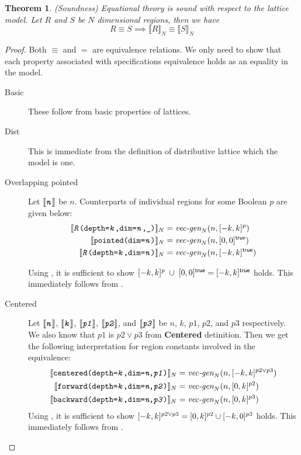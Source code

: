 \documentclass{article}
\theoremstyle{definition}
\theoremstyle{plain}
\newtheorem{thm}{Theorem}
\newcommand{\interp}[1]{\llbracket {#1} \rrbracket}
\newcommand{\interv}[3]{\textnormal{$\lbrack#1,#2\rbrack^{#3}$}}
\newcommand{\vecgen}[3]{\textnormal{$\textit{vec-gen}_{#1}(#2,#3)$}}
\newcommand{\textcap}[1]{\texttt{\textit{#1}}}
\begin{document}
\begin{thm}{(Soundness)}
  Equational theory is sound with respect to the lattice model. Let $R$
  and $S$ be $N$ dimensional regions, then we have
%
  \begin{equation*}
    R \equiv S \implies \interp{R}_N \equiv \interp{S}_N
  \end{equation*}
\end{thm}

\begin{proof}
  Both $\equiv$ and $=$ are equivalence relations. We only need to show that
  each property associated with specifications equivalence holds as an equality
  in the model.
%
  \begin{description}
    \item[Basic] These follow from basic properties of lattices.
%
    \item[Dist] This is immediate from the definition of distributive
      lattice which the model is one.
%
    \item[Overlapping pointed] Let $\interp{\textcap{n}}$ be $n$. Counterparts
      of individual regions for some Boolean $p$ are given below:
%
      \begin{align*}
        \interp{\texttt{\textcap{R}(depth=\textcap{k},dim=\textcap{n},\_)}}_N
        & = \vecgen{N}{n}{\interv{-k}{k}{p}} \\
%
        \interp{\texttt{pointed(dim=\textcap{n})}}_N
        &= \vecgen{N}{n}{\interv{0}{0}{\textsf{true}}} \\
%
        \interp{\texttt{\textcap{R}(depth=\textcap{k},dim=\textcap{n})}}_N
        &= \vecgen{N}{n}{\interv{-k}{k}{\textsf{true}}}
      \end{align*}

      Using , it is sufficient to show
      $ \interv{-k}{k}{p} \;\cup\; \interv{0}{0}{\textsf{true}} =
        \interv{-k}{k}{\textsf{true}} $ holds. This immediately follows from
      .
%
    \item[Centered] Let $\interp{\textcap{n}}$, $\interp{\textcap{k}}$,
      $\interp{\textcap{p1}}$, $\interp{\textcap{p2}}$, and
      $\interp{\textcap{p3}}$ be $n$, $k$, $p1$, $p2$, and $p3$ respectively. We
      also know that $p1$ is $p2 \vee p3$ from \textbf{Centered} detinition.
      Then we get the following interpretation for region constants involved in
      the equivalence:
%
      \begin{align*}
        \interp{\texttt{centered(depth=\textcap{k},dim=\textit{n},\textcap{p1})}}_N
          &= \vecgen{N}{n}{\interv{-k}{k}{p2 \vee p3}} \\
%
        \interp{\texttt{forward(depth=\textcap{k},dim=\textit{n},\textcap{p2})}}_N
          &= \vecgen{N}{n}{\interv{0}{k}{p2} }\\
%
        \interp{\texttt{backward(depth=\textcap{k},dim=\textit{n},\textcap{p3})}}_N
          &= \vecgen{N}{n}{\interv{0}{k}{p3}}
      \end{align*}
%
      Using , it is sufficient to show $\interv{-k}{k}{p2
      \vee p3} = \interv{0}{k}{p2} \cup \interv{-k}{0}{p3}$ holds. This
      immediately follows from .


\end{description}
\end{proof}
\end{document}
